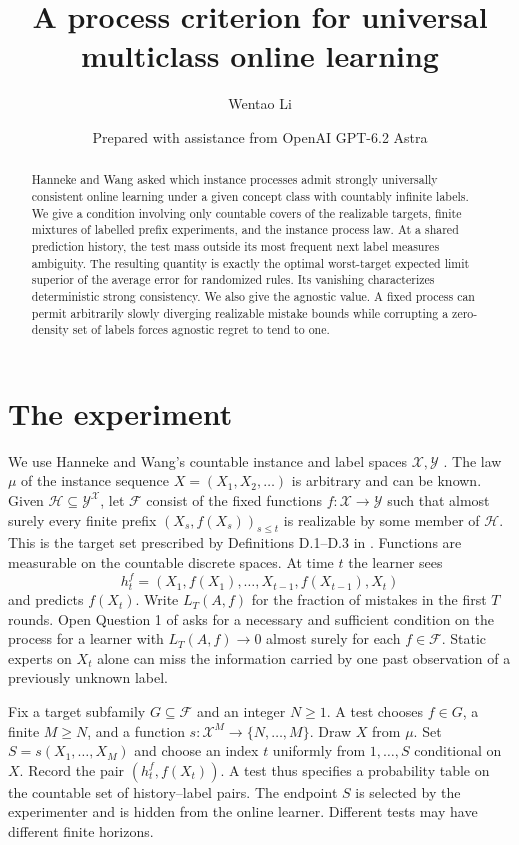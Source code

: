 \documentclass[11pt]{article}
\title{A process criterion for universal multiclass online learning}
\author{Wentao Li}
\date{\small Prepared with assistance from OpenAI GPT-6.2 Astra}
\newcommand{\F}{\mathcal F}
\newcommand{\Hc}{\mathcal H}
\begin{document}
\maketitle
\begin{abstract}
Hanneke and Wang asked which instance processes admit strongly universally consistent online learning under a given concept class with countably infinite labels. We give a condition involving only countable covers of the realizable targets, finite mixtures of labelled prefix experiments, and the instance process law. At a shared prediction history, the test mass outside its most frequent next label measures ambiguity. The resulting quantity is exactly the optimal worst-target expected limit superior of the average error for randomized rules. Its vanishing characterizes deterministic strong consistency. We also give the agnostic value. A fixed process can permit arbitrarily slowly diverging realizable mistake bounds while corrupting a zero-density set of labels forces agnostic regret to tend to one.
\end{abstract}

\section{The experiment}
We use Hanneke and Wang's countable instance and label spaces $\mathcal X,\mathcal Y$ \cite[Appendix D]{hw}. The law $\mu$ of the instance sequence $X=(X_1,X_2,\ldots)$ is arbitrary and can be known. Given $\Hc\subseteq\mathcal Y^{\mathcal X}$, let $\F$ consist of the fixed functions $f:\mathcal X\to\mathcal Y$ such that almost surely every finite prefix $(X_s,f(X_s))_{s\le t}$ is realizable by some member of $\Hc$. This is the target set prescribed by Definitions D.1--D.3 in \cite{hw}. Functions are measurable on the countable discrete spaces. At time $t$ the learner sees
\[
 h_t^f=(X_1,f(X_1),\ldots,X_{t-1},f(X_{t-1}),X_t)
\]
and predicts $f(X_t)$. Write $L_T(A,f)$ for the fraction of mistakes in the first $T$ rounds. Open Question 1 of \cite[Appendix D.1]{hw} asks for a necessary and sufficient condition on the process for a learner with $L_T(A,f)\to0$ almost surely for each $f\in\F$. Static experts on $X_t$ alone can miss the information carried by one past observation of a previously unknown label.

Fix a target subfamily $G\subseteq\F$ and an integer $N\ge1$. A test chooses $f\in G$, a finite $M\ge N$, and a function $s:\mathcal X^M\to\{N,\ldots,M\}$. Draw $X$ from $\mu$. Set $S=s(X_1,\ldots,X_M)$ and choose an index $t$ uniformly from $1,\ldots,S$ conditional on $X$. Record the pair $(h_t^f,f(X_t))$. A test thus specifies a probability table on the countable set of history--label pairs. The endpoint $S$ is selected by the experimenter and is hidden from the online learner. Different tests may have different finite horizons.
\end{document}
